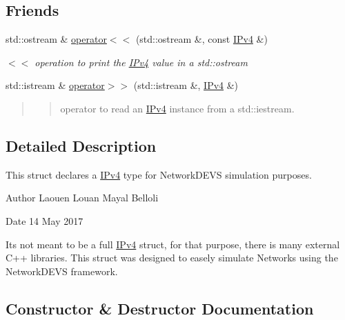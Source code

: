 \subsection*{Friends}
\begin{DoxyCompactItemize}
\item 
std\+::ostream \& \hyperlink{structIPv4_ab5644dcfa13678c430f256332e31c671}{operator$<$$<$} (std\+::ostream \&, const \hyperlink{structIPv4}{I\+Pv4} \&)
\begin{DoxyCompactList}\small\item\em $<$$<$ operation to print the \hyperlink{structIPv4}{I\+Pv4} value in a std\+::ostream \end{DoxyCompactList}\item 
std\+::istream \& \hyperlink{structIPv4_a47e7e07277bbcacf06f17b1c2fc59f7f}{operator$>$$>$} (std\+::istream \&, \hyperlink{structIPv4}{I\+Pv4} \&)
\begin{DoxyCompactList}\small\item\em \begin{quote}
\begin{quote}
operator to read an \hyperlink{structIPv4}{I\+Pv4} instance from a std\+::iestream. \end{quote}
\end{quote}
\end{DoxyCompactList}\end{DoxyCompactItemize}


\subsection{Detailed Description}
This struct declares a \hyperlink{structIPv4}{I\+Pv4} type for Network\+D\+E\+VS simulation purposes. 

\begin{DoxyAuthor}{Author}
Laouen Louan Mayal Belloli 
\end{DoxyAuthor}
\begin{DoxyDate}{Date}
14 May 2017
\end{DoxyDate}
It\textquotesingle{}s not meant to be a full \hyperlink{structIPv4}{I\+Pv4} struct, for that purpose, there is many external C++ libraries. This struct was designed to easely simulate Networks using the Network\+D\+E\+VS framework. 

\subsection{Constructor \& Destructor Documentation}
